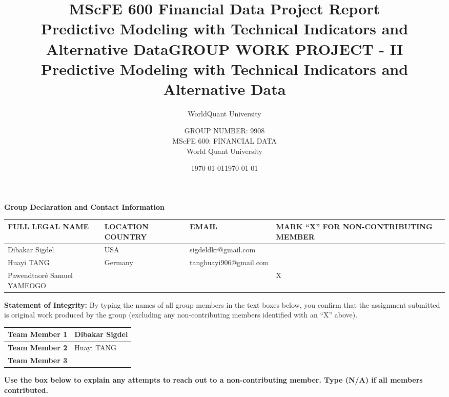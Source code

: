 \documentclass[12pt]{article}
\title{\textbf{MScFE 600 Financial Data Project Report} \\ \large Predictive Modeling with Technical Indicators and Alternative Data}
\author{WorldQuant University}
\date{\today}
\title{\textbf{GROUP WORK PROJECT - II} \\ \large Predictive Modeling with Technical Indicators and Alternative Data}
\author{GROUP NUMBER: 9908 \\
MScFE 600: FINANCIAL DATA \\
World Quant University}
\date{\today}
\begin{document}
\maketitle




\begin{titlepage}
\begin{center}
    \Large \textbf{Group Declaration and Contact Information}
\end{center}
\vspace{0.5cm}

\noindent
\begin{tabular}{|p{3.5cm}|p{2.5cm} |p{4.5cm}|p{3.5cm}|}
\hline
\textbf{FULL LEGAL NAME}& \textbf{LOCATION COUNTRY} & \textbf{EMAIL} & \textbf{MARK “X” FOR NON-CONTRIBUTING MEMBER} \\
\hline
Dibakar Sigdel & USA & sigdeldkr@gmail.com & \\
\hline
Huayi TANG & Germany & tanghuayi906@gmail.com & \\
\hline
Pawendtaoré Samuel YAMEOGO & & & X \\
\hline
\end{tabular}

\vspace{1cm}

\noindent
\textbf{Statement of Integrity:} By typing the names of all group members in the text boxes below, you confirm that the assignment submitted is original work produced by the group (excluding any non-contributing members identified with an “X” above).

\vspace{0.5cm}

\noindent
\begin{tabular}{|p{6cm}|p{6cm}|}
\hline
\textbf{Team Member 1} & Dibakar Sigdel \\
\hline
\textbf{Team Member 2} &  Huayi TANG\\
\hline
\textbf{Team Member 3} &  \\
\hline
\end{tabular}

\vspace{1cm}

\noindent
\textbf{Use the box below to explain any attempts to reach out to a non-contributing member. Type (N/A) if all members contributed.}

\vspace{0.3cm}

\noindent
{}

\vfill

\end{titlepage}
\end{document}
